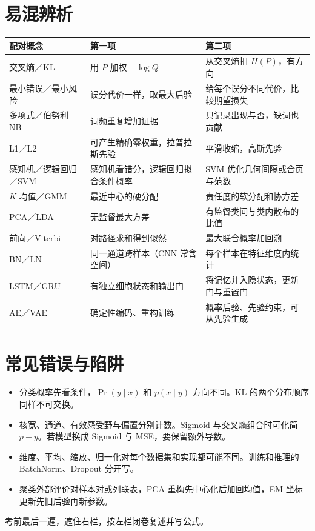 \documentclass[UTF8,a4paper,zihao=-4,fontset=fandol]{ctexrep}
\begin{document}
\section{易混辨析}
\begin{tabularx}{\linewidth}{@{}p{.23\linewidth}XX@{}}
\toprule
配对概念 & 第一项 & 第二项\\
\midrule
交叉熵／KL & 用 $P$ 加权 $-\log Q$ & 从交叉熵扣 $H(P)$，有方向\\
最小错误／最小风险 & 误分代价一样，取最大后验 & 给每个误分不同代价，比较期望损失\\
多项式／伯努利 NB & 词频重复增加证据 & 只记录出现与否，缺词也贡献\\
L1／L2 & 可产生精确零权重，拉普拉斯先验 & 平滑收缩，高斯先验\\
感知机／逻辑回归／SVM & 感知机看错分，逻辑回归拟合条件概率 & SVM 优化几何间隔或合页与范数\\
$K$ 均值／GMM & 最近中心的硬分配 & 责任度的软分配和协方差\\
PCA／LDA & 无监督最大方差 & 有监督类间与类内散布的比值\\
前向／Viterbi & 对路径求和得到似然 & 最大联合概率加回溯\\
BN／LN & 同一通道跨样本（CNN 常含空间） & 每个样本在特征维度内统计\\
LSTM／GRU & 有独立细胞状态和输出门 & 将记忆并入隐状态，更新门与重置门\\
AE／VAE & 确定性编码、重构训练 & 概率后验、先验约束，可从先验生成\\
\bottomrule
\end{tabularx}

\section{常见错误与陷阱}
\begin{itemize}
\item 分类概率先看条件，$\Pr(y\mid x)$ 和 $p(x\mid y)$ 方向不同。KL 的两个分布顺序同样不可交换。
\item 核宽、通道、有效感受野与偏置分别计数。Sigmoid 与交叉熵组合时可化简 $p-y$。若模型换成 Sigmoid 与 MSE，要保留额外导数。
\item 维度、平均、缩放、归一化对每个数据集和实现都可能不同。训练和推理的 BatchNorm、Dropout 分开写。
\item 聚类外部评价对样本对或列联表，PCA 重构先中心化后加回均值，EM 坐标更新先旧后验再新参数。
\end{itemize}

\clearpage
\thispagestyle{fancy}
\par
\medskip
\noindent 考前最后一遍，遮住右栏，按左栏闭卷复述并写公式。
\end{document}
